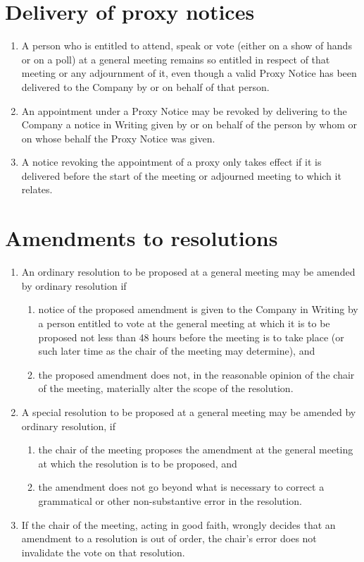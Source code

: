 \documentclass[a4paper,12pt]{article}
\begin{document}
\section{Delivery of proxy notices}

\begin{enumerate}
  \item A person who is entitled to attend, speak or vote (either on a show of hands or on a poll) at a general meeting remains so entitled in respect of that meeting or any adjournment of it, even though a valid Proxy Notice has been delivered to the Company by or on behalf of that person.
  \item An appointment under a Proxy Notice may be revoked by delivering to the Company a notice in Writing given by or on behalf of the person by whom or on whose behalf the Proxy Notice was given.
  \item A notice revoking the appointment of a proxy only takes effect if it is delivered before the start of the meeting or adjourned meeting to which it relates.
\end{enumerate}

\section{Amendments to resolutions}

\begin{enumerate}
  \item An ordinary resolution to be proposed at a general meeting may be amended by ordinary resolution if
  \begin{enumerate}
    \item notice of the proposed amendment is given to the Company in Writing by a person entitled to vote at the general meeting at which it is to be proposed not less than 48 hours before the meeting is to take place (or such later time as the chair of the meeting may determine), and
    \item the proposed amendment does not, in the reasonable opinion of the chair of the meeting, materially alter the scope of the resolution.
  \end{enumerate}
  \item A special resolution to be proposed at a general meeting may be amended by ordinary resolution, if
  \begin{enumerate}
    \item the chair of the meeting proposes the amendment at the general meeting at which the resolution is to be proposed, and
    \item the amendment does not go beyond what is necessary to correct a grammatical or other non-substantive error in the resolution.
  \end{enumerate}
  \item If the chair of the meeting, acting in good faith, wrongly decides that an amendment to a resolution is out of order, the chair’s error does not invalidate the vote on that resolution.
\end{enumerate}
\end{document}
